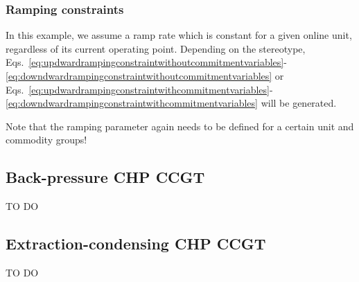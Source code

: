 \documentclass[10pt,english]{article}
\begin{document}
\subsubsection{Ramping constraints}
In this example, we assume a ramp rate which is constant for a given online unit, regardless of its current operating point. Depending on the stereotype, Eqs.~\eqref{eq:updwardrampingconstraintwithoutcommitmentvariables}-\eqref{eq:downdwardrampingconstraintwithoutcommitmentvariables} or Eqs.~\eqref{eq:updwardrampingconstraintwithcommitmentvariables}-\eqref{eq:downdwardrampingconstraintwithcommitmentvariables} will be generated.

Note that the ramping parameter again needs to be defined for a certain unit and commodity groups!




\subsection{Back-pressure CHP CCGT}
TO DO



\subsection{Extraction-condensing CHP CCGT}
TO DO




% 
% 




% 
% 
\end{document}
